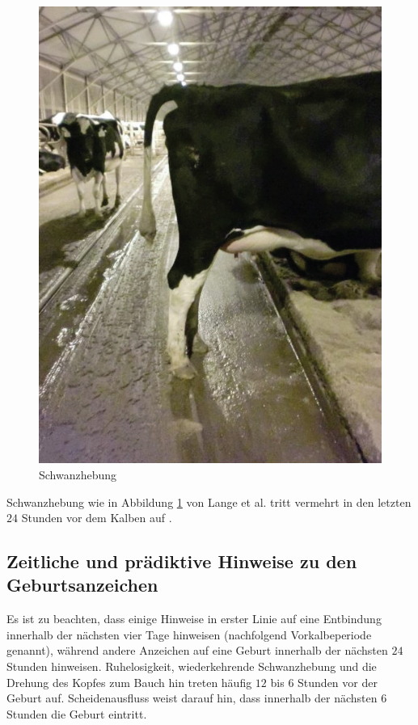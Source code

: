 \begin{figure}[H]
	\center
	\includegraphics[scale=.45]{Grafiken/schwanzhebung.jpg}
	\caption{Schwanzhebung}
	\label{fig: Schwanzhebung}
\end{figure}

Schwanzhebung wie in Abbildung  \ref{fig: Schwanzhebung} von Lange et al. tritt vermehrt in den letzten $24$ Stunden vor dem Kalben auf \cite[S. 1 f.]{Lange2017}.
\subsection{Zeitliche und prädiktive Hinweise zu den Geburtsanzeichen}
Es ist zu beachten, dass einige Hinweise in erster Linie auf eine Entbindung innerhalb der nächsten vier Tage hinweisen (nachfolgend Vorkalbeperiode genannt), während andere Anzeichen auf eine Geburt innerhalb der nächsten $24$ Stunden hinweisen. Ruhelosigkeit, wiederkehrende Schwanzhebung und die Drehung des Kopfes zum Bauch hin treten häufig $12$ bis $6$ Stunden vor der Geburt auf. Scheidenausfluss weist darauf hin, dass innerhalb der nächsten $6$ Stunden die Geburt eintritt. \citep[S. 1]{Lange2017}

